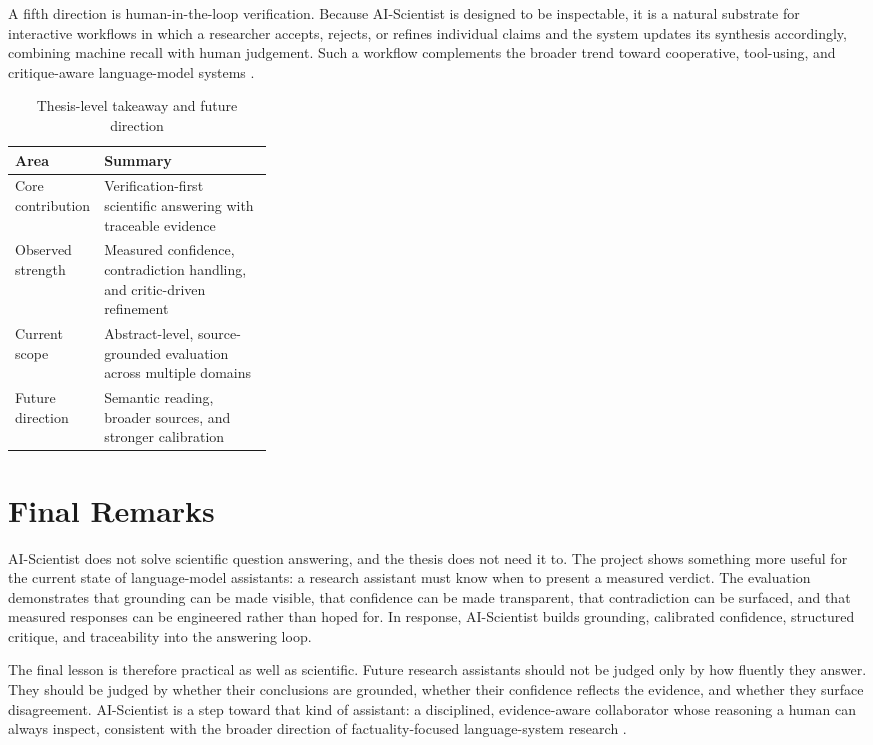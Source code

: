 A fifth direction is human-in-the-loop verification. Because AI-Scientist is designed to be inspectable, it is a
natural substrate for interactive workflows in which a researcher accepts, rejects, or refines individual claims and
the system updates its synthesis accordingly, combining machine recall with human judgement.
Such a workflow complements the broader trend toward cooperative, tool-using, and critique-aware language-model
systems \cite{wu2023autogen,asai2024selfrag}.

\begin{table}[!htbp]
\centering
\caption{Thesis-level takeaway and future direction}
\begin{tabularx}{0.94\linewidth}{>{\raggedright\arraybackslash}p{0.30\linewidth} >{\raggedright\arraybackslash}X}
\toprule
Area & Summary \\
\midrule
Core contribution & Verification-first scientific answering with traceable evidence \\
Observed strength & Measured confidence, contradiction handling, and critic-driven refinement \\
Current scope & Abstract-level, source-grounded evaluation across multiple domains \\
Future direction & Semantic reading, broader sources, and stronger calibration \\
\bottomrule
\end{tabularx}
\end{table}

\section{Final Remarks }

AI-Scientist does not solve scientific question answering, and the thesis does not need it to. The project shows
something more useful for the current state of language-model assistants: a research assistant must know when to
present a measured verdict. The evaluation demonstrates that grounding can be made visible, that confidence can be
made transparent, that contradiction can be surfaced, and that measured responses can be engineered rather than
hoped for. In response, AI-Scientist builds grounding, calibrated confidence, structured critique, and
traceability into the answering loop.

The final lesson is therefore practical as well as scientific. Future research assistants should not be judged only
by how fluently they answer. They should be judged by whether their conclusions are grounded, whether their
confidence reflects the evidence, and whether they surface disagreement. AI-Scientist is a step toward that kind
of assistant: a disciplined, evidence-aware collaborator whose reasoning a human can always inspect, consistent
with the broader direction of factuality-focused language-system research \cite{ji2023hallucination,huang2023hallucinationsurvey,es2023ragas}.

